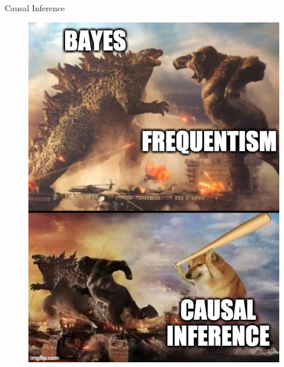 \documentclass[handout]{beamer}
\begin{document}
\begin{frame}{Causal Inference}


\begin{figure}[h!]
	\centering
	\includegraphics[scale=0.3]{pics/causalMeme.jpeg}
	\end{figure} 



\end{frame}
\end{document}
